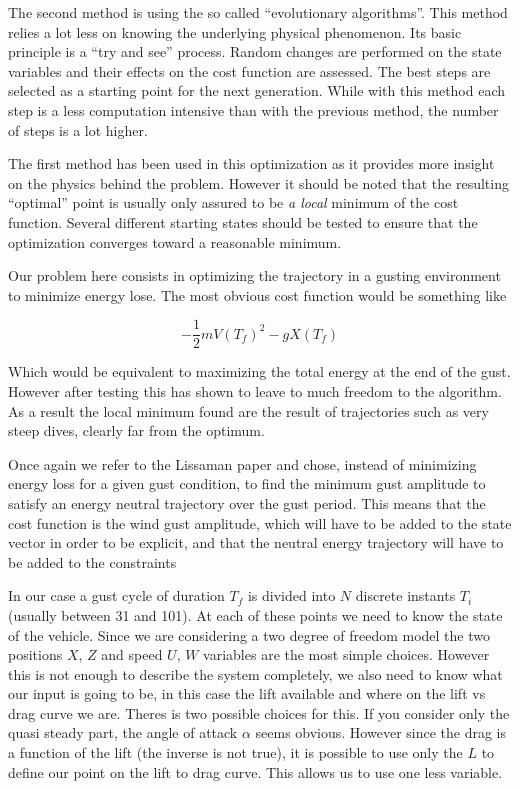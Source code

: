\par The second method is using the so called ``evolutionary algorithms''. 
This method relies a lot less on knowing the underlying physical phenomenon.
Its basic principle is a ``try and see'' process.
Random changes are performed on the state variables and their effects on the cost function are assessed.
The best steps are selected as a starting point for the next generation.
While with this method each step is a less computation intensive than with the previous method, the number of steps is a lot higher.

\par The first method has been used in this optimization as it provides more insight on the physics behind the problem.
However it should be noted that the resulting ``optimal'' point is usually only assured to be \emph{a local} minimum of the cost function.
Several different starting states should be tested to ensure that the optimization converges toward a reasonable minimum.

Our problem here consists in optimizing the trajectory in a gusting environment to minimize energy lose.
The most obvious cost function would be something like

\begin{equation}
  - \frac{1}{2}m{V(T_f)}^2 - gX(T_f)
  \label{eqn:eni_cost_fun}
\end{equation}

Which would be equivalent to maximizing the total energy at the end of the gust.
However after testing this has shown to leave to much freedom to the algorithm. 
As a result the local minimum found are the result of trajectories such as very steep dives, clearly far from the optimum.

\par Once again we refer to the Lissaman paper \cite{Lissaman2007neutral} and chose, instead of minimizing energy loss for a given gust condition, to find the minimum gust amplitude to satisfy an energy neutral trajectory over the gust period.
This means that the cost function is the wind gust amplitude, which will have to be added to the state vector in order to be explicit, and that the neutral energy trajectory will have to be added to the constraints

In our case a gust cycle of duration $T_f$ is divided into $N$ discrete instants $T_i$ (usually between 31 and 101).
At each of these points we need to know the state of the vehicle.
Since we are considering a two degree of freedom model the two positions $X$, $Z$ and speed $U$, $W$ variables are the most simple choices.
However this is not enough to describe the system completely, we also need to know what our input is going to be, in this case the lift available and where on the lift vs drag curve we are.
Theres is two possible choices for this.
If you consider only the quasi steady part, the angle of attack $\alpha$ seems obvious.
However since the drag is a function of the lift (the inverse is not true), it is possible to use only the $L$ to define our point on the lift to drag curve.
This allows us to use one less variable.

